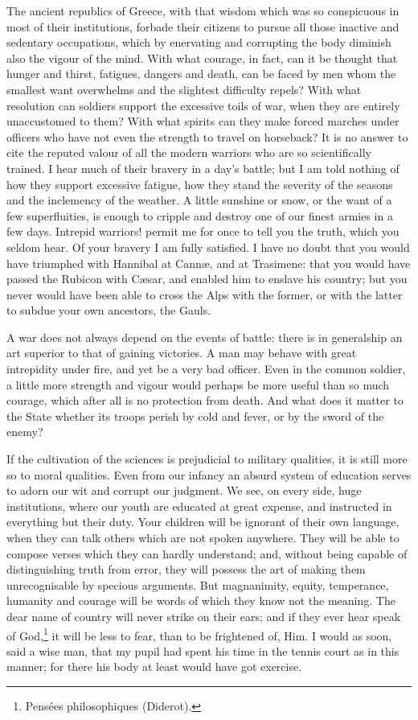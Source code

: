 The ancient republics of Greece, with that wisdom which was so
conspicuous in most of their institutions, forbade their citizens to
pursue all those inactive and sedentary occupations, which by
enervating and corrupting the body diminish also the vigour of the
mind. With what courage, in fact, can it be thought that hunger and
thirst, fatigues, dangers and death, can be faced by men whom the
smallest want overwhelms and the slightest difficulty repels? With
what resolution can soldiers support the excessive toils of war, when
they are entirely unaccustomed to them? With what spirits can they
make forced marches under officers who have not even the strength to
travel on horseback? It is no answer to cite the reputed valour of all
the modern warriors who are so scientifically trained. I hear much of
their bravery in a day's battle; but I am told nothing of how they
support excessive fatigue, how they stand the severity of the seasons
and the inclemency of the weather. A little sunshine or snow, or the
want of a few superfluities, is enough to cripple and destroy one of
our finest armies in a few days. Intrepid  warriors! permit
me for once to tell you the truth, which you seldom hear. Of your
bravery I am fully satisfied. I have no doubt that you would have
triumphed with Hannibal at Cann\ae, and at Trasimene: that you would
have passed the Rubicon with C\ae sar, and enabled him to enslave his
country; but you never would have been able to cross the Alps with the
former, or with the latter to subdue your own ancestors, the Gauls.

A war does not always depend on the events of battle: there is in
generalship an art superior to that of gaining victories. A man may
behave with great intrepidity under fire, and yet be a very bad
officer. Even in the common soldier, a little more strength and vigour
would perhaps be more useful than so much courage, which after all is
no protection from death. And what does it matter to the State whether
its troops perish by cold and fever, or by the sword of the enemy?

If the cultivation of the sciences is prejudicial to military
qualities, it is still more so to moral qualities. Even from our
infancy an absurd system of education serves to adorn our wit and
corrupt our judgment. We see, on every side, huge institutions, where
our youth are educated at great expense, and instructed in everything
but their duty. Your children will be ignorant of their own language,
when they can talk others which are not spoken anywhere. They will be
able to compose verses which they can hardly understand; and, without
being capable of distinguishing truth from error, they will possess
the art of making them unrecognisable by specious arguments. But
magnanimity, equity, temperance, humanity and courage will be words of
which they know not the meaning. The dear name of country will never
strike on their ears; and if they ever hear speak of
God,\footnote{Pens\'ees philosophiques (Diderot).} it will be less to
fear, than to be frightened of, Him. I would as soon, said a wise man,
that my pupil had spent his time in the tennis court as in this
manner; for there his body at least would have got exercise.

